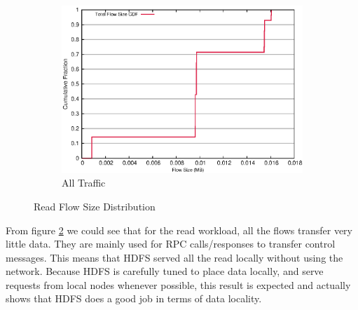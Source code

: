 \begin{figure}
\begin{subfigure}[b]{.55\linewidth}
   \centering
	\includegraphics[width=.99\textwidth]{figures/4read/flow_size.eps}
	\caption{All Traffic}\label{fig:read_size:all}
   \end{subfigure}%
\caption{Read Flow Size Distribution}
\label{fig:read_size}
\end{figure}

From figure \ref{fig:read_size} we could see that for the read workload, all the flows transfer very little data. They are mainly used for RPC calls/responses to transfer control messages. This means that HDFS served all the read locally without using the network. Because HDFS is carefully tuned to place data locally, and serve requests from local nodes whenever possible, this result is expected and actually shows that HDFS does a good job in terms of data locality.

